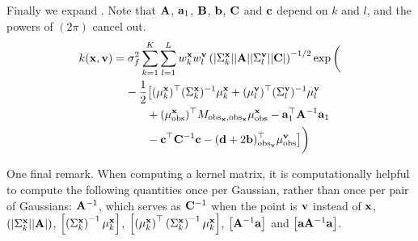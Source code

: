 \documentclass[letterpaper]{article}
\newcommand{\tp}{\top}
\newcommand{\vx}{{\bf x}}
\newcommand{\vv}{{\bf v}}
\newcommand{\va}{{\bf a}}
\newcommand{\vA}{{\bf A}}
\newcommand{\vb}{{\bf b}}
\newcommand{\vB}{{\bf B}}
\newcommand{\vc}{{\bf c}}
\newcommand{\vd}{{\bf d}}
\newcommand{\vC}{{\bf C}}
\newcommand{\obs}{\text{obs}}
\newcommand{\obsx}{{\text{obs}_\vx}}
\newcommand{\obsv}{{\text{obs}_\vv}}
\begin{document}
Finally we expand . Note that $\vA$, $\va_1$,
$\vB$, $\vb$, $\vC$ and $\vc$ depend on $k$ and $l$, and the powers of $(2\pi)$
cancel out.
\begin{equation*}
\begin{aligned}
  k(\vx, \vv) &= \sigma_f^2 \sum_{k=1}^K\sum_{l=1}^L w_k^\vx w_l^\vv
  \left(|\Sigma_k^\vx||\vA||\Sigma_l^\vv||\vC|\right)^{-1/2} \exp \bigg(\\
  &\hspace{1.1em} -\frac{1}{2} \big[
(\mu_k^\vx)^\tp (\Sigma_k^\vx)^{-1} \mu_k^\vx
+ (\mu_l^\vv)^\tp (\Sigma_l^\vv)^{-1}\mu_l^\vv \\
&\hspace{3em}+ (\mu^\vx_\obs)^\tp M_{\obsx,\obsx}\mu^\vx_\obs
- \va_1^\tp \vA^{-1} \va_1  \\
&\hspace{3em}- \vc^\tp\vC^{-1} \vc - (\vd + 2\vb)^\tp_\obsv\mu_\obs^\vv
\big] \bigg) \\
\end{aligned}
\end{equation*}

One final remark. When computing a kernel matrix, it is computationally helpful
to compute the following quantities once per Gaussian, rather than once per pair of Gaussians:
$\vA^{-1}$, which serves as $\vC^{-1}$ when the point is $\vv$ instead of $\vx$,
$(|\Sigma_k^\vx||\vA|)$, $\left[\left(\Sigma_k^\vx\right)^{-1} \mu_k^\vx\right]$,
$\left[\left(\mu_k^\vx\right)^\tp
\left(\Sigma_k^\vx\right)^{-1}\mu_k^\vx\right]$, $\left[\vA^{-1}\va\right]$ and
$\left[\va\vA^{-1}\va\right]$.
\end{document}
